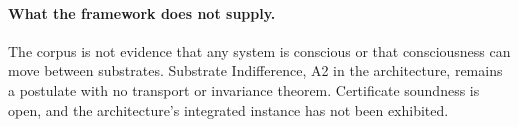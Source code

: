 \paragraph{What the framework does not supply.}
The corpus is not evidence that any system is conscious or that consciousness
can move between substrates. Substrate Indifference, A2 in the architecture,
remains a postulate with no transport or invariance theorem. Certificate
soundness is open, and the architecture's integrated instance has not been
exhibited.

